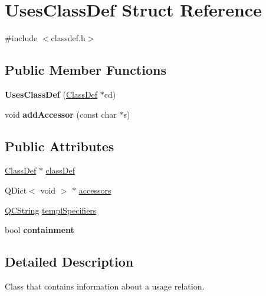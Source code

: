 \hypertarget{struct_uses_class_def}{}\section{Uses\+Class\+Def Struct Reference}
\label{struct_uses_class_def}


{\ttfamily \#include $<$classdef.\+h$>$}

\subsection*{Public Member Functions}
\begin{DoxyCompactItemize}
\item 
\mbox{\label{struct_uses_class_def_a315e3fb5ca3523ec88e0ede4d4accafe}} 
{\bfseries Uses\+Class\+Def} (\mbox{\hyperlink{class_class_def}{Class\+Def}} $\ast$cd)
\item 
\mbox{\label{struct_uses_class_def_acd67c9ac9fa34ad720a18bfab77b828a}} 
void {\bfseries add\+Accessor} (const char $\ast$s)
\end{DoxyCompactItemize}
\subsection*{Public Attributes}
\begin{DoxyCompactItemize}
\item 
\mbox{\hyperlink{class_class_def}{Class\+Def}} $\ast$ \mbox{\hyperlink{struct_uses_class_def_ae9ace813f9031b4afb6894e5ad15f901}{class\+Def}}
\item 
Q\+Dict$<$ void $>$ $\ast$ \mbox{\hyperlink{struct_uses_class_def_a41838afce51128c142e9fbb4998aa7c6}{accessors}}
\item 
\mbox{\hyperlink{class_q_c_string}{Q\+C\+String}} \mbox{\hyperlink{struct_uses_class_def_a5f65373ed5c0409ef538193d0e58f06d}{templ\+Specifiers}}
\item 
\mbox{\label{struct_uses_class_def_a0373cf528ea065d333d13b085cf50b90}} 
bool {\bfseries containment}
\end{DoxyCompactItemize}


\subsection{Detailed Description}
Class that contains information about a usage relation. 

